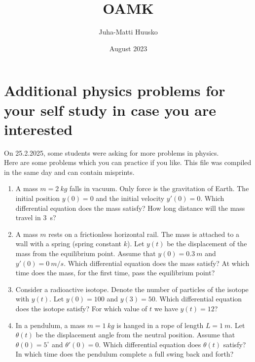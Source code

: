\documentclass[12pt]{article}
\title{OAMK}
\author{Juha-Matti Huusko}
\date{August 2023}
\begin{document}
\thispagestyle{empty}

\section*{Additional physics problems for your self study in case you are interested}

On 25.2.2025, some students were asking for more problems in physics.\\

\noindent Here are some problems which you can practice if you like. This file was compiled in the same day and can contain misprints.

\begin{enumerate}
\item A mass $m=2~kg$ falls in vacuum. Only force is the gravitation of Earth. The initial position $y(0)=0$ and the initial velocity $y'(0)=0$. Which differential equation does the mass satisfy?  How long distance will the mass travel in 3~s?

\item A mass $m$ rests on a frictionless horizontal rail. The mass is attached to a wall with a spring (spring constant $k$). Let $y(t)$ be the displacement of the mass from the equilibrium point. Assume that $y(0)=0.3~m$ and $y'(0)=0~m/s$. Which differential equation does the mass satisfy? At which time does the mass, for the first time, pass the equilibrium point?

\item Consider a radioactive isotope. Denote the number of particles of the isotope with $y(t)$. Let $y(0)=100$ and $y(3)=50$. Which differential equation does the isotope satisfy? For which value of $t$ we have $y(t)=12$?

\item In a pendulum, a mass $m=1~kg$ is hanged in a rope of length $L=1~m$. Let $\theta(t)$ be the displacement angle from the neutral position. Assume that $\theta(0)=5^\circ$ and $\theta'(0)=0$. Which differential equation does $\theta(t)$ satisfy? In which time does the pendulum complete a full swing back and forth?
\end{enumerate}
\end{document}

